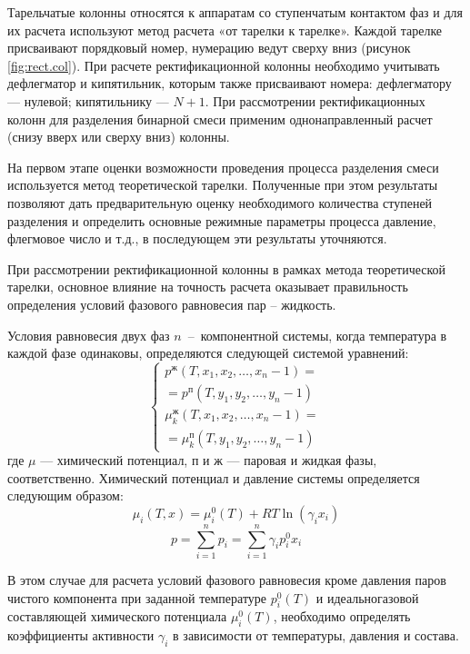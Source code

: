 Тарельчатые колонны относятся к аппаратам со ступенчатым контактом фаз и для их расчета используют метод расчета «от тарелки к тарелке». Каждой тарелке присваивают порядковый номер, нумерацию ведут сверху вниз (рисунок \ref{fig:rect.col}). При расчете ректификационной колонны необходимо учитывать дефлегматор и кипятильник, которым также присваивают номера: дефлегматору --- нулевой; кипятильнику --- $N + 1$. При рассмотрении ректификационных колонн для разделения бинарной смеси применим однонаправленный расчет (снизу вверх или сверху вниз) колонны.


На первом этапе оценки возможности проведения процесса разделения смеси используется метод теоретической тарелки. Полученные при этом результаты позволяют дать предварительную оценку необходимого количества ступеней разделения и определить основные режимные параметры процесса давление, флегмовое число и т.д., в последующем эти результаты уточняются. 

При рассмотрении ректификационной колонны в рамках метода теоретической тарелки, основное влияние на точность расчета оказывает правильность определения условий фазового равновесия пар – жидкость. 

Условия равновесия двух фаз $n$~-- компонентной системы, когда температура в каждой фазе одинаковы, определяются следующей системой уравнений:
\begin{equation}
	\left\lbrace 
	\begin{gathered} 
	p^{ж}(T, x_1, x_2, \ldots, x_n-1)=\\=p^{п}(T, y_1, y_2, \ldots, y_n-1)\\
	\mu_k^{ж}(T, x_1, x_2, \ldots, x_n-1)=\\=\mu^{п}_k(T, y_1, y_2, \ldots, y_n-1) 
	\end{gathered} 
	\right.
\end{equation}
где $\mu$ --- химический потенциал, $п$ и $ж$ --- паровая и жидкая фазы, соответственно. Химический потенциал и давление системы определяется следующим образом:
\begin{equation}
	\mu_i(T,x)=\mu_i^0 (T) +RT \ln(\gamma_i x_i)
\end{equation}
\begin{equation}
	p=\sum\limits_{i=1}^{n} p_i= \sum\limits_{i=1}^{n} \gamma_i p_i^0 x_i
\end{equation}

В этом случае для расчета условий фазового равновесия кроме давления паров чистого компонента при заданной температуре $p_i^0(T)$ и идеальногазовой составляющей химического потенциала $\mu_i^0(T)$, необходимо определять коэффициенты активности $\gamma_i$ в зависимости от температуры, давления и состава.

